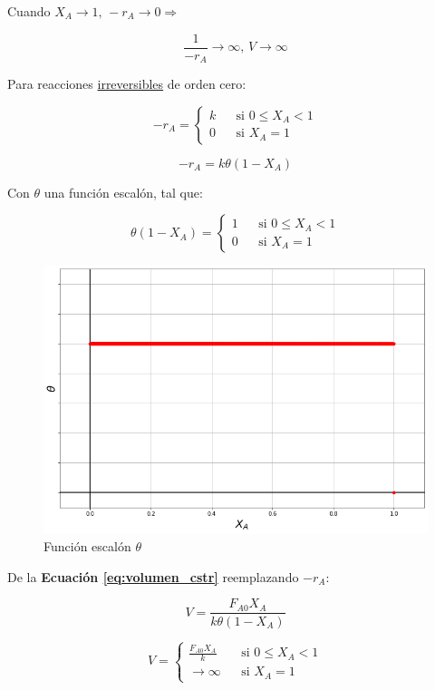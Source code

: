             Cuando \(X_{A} \rightarrow 1 \text{, } -r_{A} \rightarrow 0 \Rightarrow\)
            
            \[\frac{1}{-r_{A}} \rightarrow \infty \text{, } V \rightarrow \infty\]
            
            Para reacciones \underline{irreversibles} de orden cero:
            
            \[-r_{A} = \left\{
            \begin{matrix}
                k &  & \text{si } 0 \leq X_{A} < 1 \\ 
                0 &  & \text{si } X_{A} = 1
            \end{matrix}\right.\]
            
            \[-r_{A} = k \theta \left ( 1 - X_{A} \right )\]
            
            Con \(\theta\) una función escalón, tal que:
            
            \[\theta \left ( 1 - X_{A} \right ) = \left\{
            \begin{matrix}
                1 &  & \text{si } 0 \leq X_{A} < 1 \\ 
                0 &  & \text{si } X_{A} = 1
            \end{matrix}\right.\]
            
            \begin{figure}
                \centering
                \includegraphics[width=.6\textwidth]{img/graficos/funcion_theta.png}
                \caption{Función escalón \(\theta\)}
                \label{fig:funcion_escalo_theta}
            \end{figure}
            
            De la \textbf{Ecuación \ref{eq:volumen_cstr}} reemplazando \(-r_{A}\):
            
            \[V = \frac{F_{A0} X_{A}}{k \theta \left ( 1 - X_{A} \right )}\]
            
            \begin{equation}
            \label{eq:volumen_cstr_irreversible_orden_cero}
                V = \left\{
                \begin{matrix}
                    \frac{F_{A0} X_{A}}{k} &  & \text{si } 0 \leq X_{A} < 1 \\ 
                    \rightarrow \infty &  & \text{si } X_{A} = 1
                \end{matrix}\right.
            \end{equation}
            
